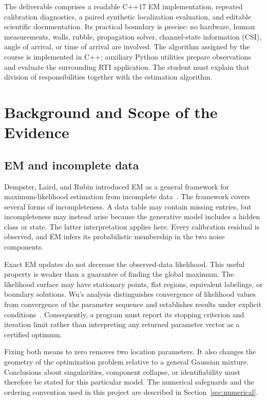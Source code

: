\documentclass[conference,letterpaper]{IEEEtran}
\begin{document}
The deliverable comprises a readable C++17 EM implementation, repeated calibration diagnostics, a paired synthetic localization evaluation, and editable scientific documentation. Its practical boundary is precise: no hardware, human measurements, walls, rubble, propagation solver, channel-state information (CSI), angle of arrival, or time of arrival are involved. The algorithm assigned by the course is implemented in C++; auxiliary Python utilities prepare observations and evaluate the surrounding RTI application. The student must explain that division of responsibilities together with the estimation algorithm.

\section{Background and Scope of the Evidence}
\subsection{EM and incomplete data}
Dempster, Laird, and Rubin introduced EM as a general framework for maximum-likelihood estimation from incomplete data~\cite{dempster1977}. The framework covers several forms of incompleteness. A data table may contain missing entries, but incompleteness may instead arise because the generative model includes a hidden class or state. The latter interpretation applies here. Every calibration residual is observed, and EM infers its probabilistic membership in the two noise components.

Exact EM updates do not decrease the observed-data likelihood. This useful property is weaker than a guarantee of finding the global maximum. The likelihood surface may have stationary points, flat regions, equivalent labelings, or boundary solutions. Wu's analysis distinguishes convergence of likelihood values from convergence of the parameter sequence and establishes results under explicit conditions~\cite{wu1983}. Consequently, a program must report its stopping criterion and iteration limit rather than interpreting any returned parameter vector as a certified optimum.

Fixing both means to zero removes two location parameters. It also changes the geometry of the optimization problem relative to a general Gaussian mixture. Conclusions about singularities, component collapse, or identifiability must therefore be stated for this particular model. The numerical safeguards and the ordering convention used in this project are described in Section~\ref{sec:numerical}.
\end{document}
